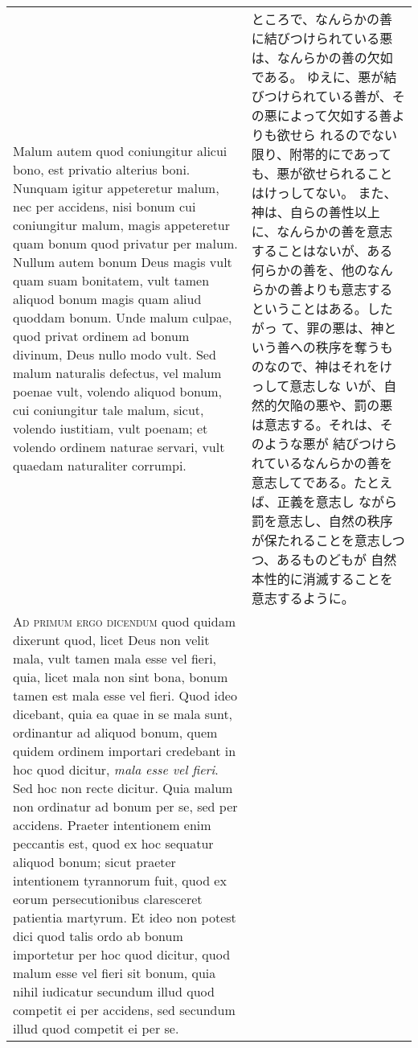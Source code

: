 \documentclass[10pt]{jsarticle} %
\begin{document}
\begin{longtable}{p{21em}p{21em}}
\\



Malum autem quod
coniungitur alicui bono, est privatio alterius boni. Nunquam igitur
appeteretur malum, nec per accidens, nisi bonum cui coniungitur malum,
magis appeteretur quam bonum quod privatur per malum. Nullum autem bonum
Deus magis vult quam suam bonitatem, vult tamen aliquod bonum magis quam
aliud quoddam bonum. Unde malum culpae, quod privat ordinem ad bonum
divinum, Deus nullo modo vult. Sed malum naturalis defectus, vel malum
poenae vult, volendo aliquod bonum, cui coniungitur tale malum, sicut,
volendo iustitiam, vult poenam; et volendo ordinem naturae servari, vult
quaedam naturaliter corrumpi.


&

ところで、なんらかの善に結びつけられている悪は、なんらかの善の欠如である。
ゆえに、悪が結びつけられている善が、その悪によって欠如する善よりも欲せら
 れるのでない限り、附帯的にであっても、悪が欲せられることはけっしてない。
 また、神は、自らの善性以上に、なんらかの善を意志することはないが、ある
 何らかの善を、他のなんらかの善よりも意志するということはある。したがっ
 て、罪の悪は、神という善への秩序を奪うものなので、神はそれをけっして意志しな
 いが、自然的欠陥の悪や、罰の悪は意志する。それは、そのような悪が
 結びつけられているなんらかの善を意志してである。たとえば、正義を意志し
 ながら罰を意志し、自然の秩序が保たれることを意志しつつ、あるものどもが
 自然本性的に消滅することを意志するように。


\\


{\scshape Ad primum ergo dicendum} quod quidam dixerunt
quod, licet Deus non velit mala, vult tamen mala esse vel fieri, quia,
licet mala non sint bona, bonum tamen est mala esse vel fieri. Quod ideo
dicebant, quia ea quae in se mala sunt, ordinantur ad aliquod bonum,
quem quidem ordinem importari credebant in hoc quod dicitur, {\itshape mala esse
vel fieri}. Sed hoc non recte dicitur. Quia malum non ordinatur ad bonum
per se, sed per accidens. Praeter intentionem enim peccantis est, quod
ex hoc sequatur aliquod bonum; sicut praeter intentionem tyrannorum
fuit, quod ex eorum persecutionibus claresceret patientia martyrum. Et
ideo non potest dici quod talis ordo ab bonum importetur per hoc quod
dicitur, quod malum esse vel fieri sit bonum, quia nihil iudicatur
secundum illud quod competit ei per accidens, sed secundum illud quod
competit ei per se.


&


\end{longtable}
\end{document}
